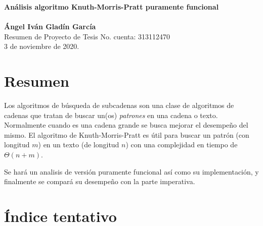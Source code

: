 \documentclass[letterpaper,10pt]{article}
\begin{document}
\noindent
\large
\textbf{Análisis algoritmo Knuth-Morris-Pratt puramente funcional} \\\\
\textbf{Ángel Iván Gladín García} \\
\normalsize Resumen de Proyecto de Tesis       \hfill No. cuenta: 313112470\\
\hfill 3 de noviembre de 2020.\\

\vspace*{-15pt}

\section{Resumen}
Los algoritmos de búsqueda de subcadenas son una clase de algoritmos de cadenas que tratan de buscar un(os)
\emph{patrones} en una cadena o texto. Normalmente cuando es una cadena grande se busca mejorar el desempeño del mismo.
El algoritmo de Knuth-Morris-Pratt es útil para buscar un patrón (con longitud $m$) en un texto (de longitud $n$) con una
complejidad en tiempo de $\Theta(n + m)$.

Se hará un analisis de versión puramente funcional así como su implementación, y finalmente se compará su desempeño con
la parte imperativa.

\section{Índice tentativo}
\end{document}
